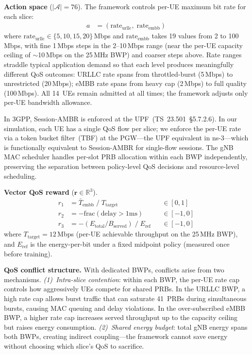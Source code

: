 \documentclass[conference]{IEEEtran}
\newcommand{\vr}{\mathbf{r}}
\newcommand{\Real}{\mathbb{R}}
\begin{document}
\textbf{Action space} ($|\mathcal{A}| = 76$).
The framework controls per-UE maximum bit rate for each slice:
\begin{align}
a &= (\text{rate}_\text{urllc},\; \text{rate}_\text{embb}) \label{eq:action}
\end{align}
where $\text{rate}_\text{urllc} \in \{5, 10, 15, 20\}$\,Mbps and $\text{rate}_\text{embb}$ takes 19 values from 2 to 100\,Mbps, with fine 1\,Mbps steps in the 2--10\,Mbps range (near the per-UE capacity ceiling of ${\sim}$10\,Mbps on the 25\,MHz BWP) and coarser steps above.
Rate ranges straddle typical application demand so that each level produces meaningfully different QoS outcomes: URLLC rate spans from throttled-burst (5\,Mbps) to unrestricted (20\,Mbps); eMBB rate spans from heavy cap (2\,Mbps) to full quality (100\,Mbps).
All 14~UEs remain admitted at all times; the framework adjusts only per-UE bandwidth allowance.

In 3GPP, Session-AMBR is enforced at the UPF~(TS~23.501~\S5.7.2.6).
In our simulation, each UE has a single QoS flow per slice; we enforce the per-UE rate via a token bucket filter~(TBF) at the PGW---the UPF equivalent in ns-3---which is functionally equivalent to Session-AMBR for single-flow sessions.
The gNB MAC scheduler handles per-slot PRB allocation within each BWP independently, preserving the separation between policy-level QoS decisions and resource-level scheduling.

\textbf{Vector QoS reward} ($\vr \in \Real^3$).
\begin{align}
r_1 &= \bar{T}_\text{embb} \;/\; T_\text{target} && \in [0, 1] \label{eq:r1} \\
r_2 &= -\text{frac}(\text{delay} > 1\text{ms}) && \in [-1, 0] \label{eq:r2} \\
r_3 &= -(E_\text{total} / B_\text{served}) \;/\; E_\text{ref} && \in [-1, 0] \label{eq:r3}
\end{align}
where $T_\text{target} = 12$\,Mbps (per-UE achievable throughput on the 25\,MHz BWP), and $E_\text{ref}$ is the energy-per-bit under a fixed midpoint policy (measured once before training).

\textbf{QoS conflict structure.}
With dedicated BWPs, conflicts arise from two mechanisms.
\emph{(1)~Intra-slice contention}: within each BWP, the per-UE rate cap controls how aggressively UEs compete for shared PRBs.
In the URLLC BWP, a high rate cap allows burst traffic that can saturate 41~PRBs during simultaneous bursts, causing MAC queuing and delay violations.
In the over-subscribed eMBB BWP, a higher rate cap increases served throughput up to the capacity ceiling but raises energy consumption.
\emph{(2)~Shared energy budget}: total gNB energy spans both BWPs, creating indirect coupling---the framework cannot save energy without choosing which slice's QoS to sacrifice.
\end{document}

